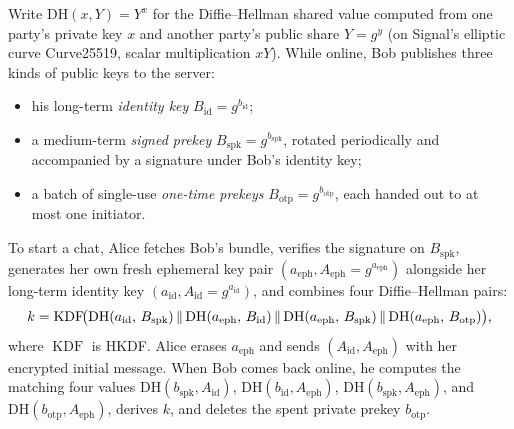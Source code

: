 Write $\mathrm{DH}(x, Y) = Y^x$ for the Diffie--Hellman shared value computed
from one party's private key $x$ and another party's public share $Y = g^y$ (on
Signal's elliptic curve Curve25519, scalar multiplication $xY$). While online,
Bob publishes three kinds of public keys to the server:
\begin{itemize}
  \item his long-term \emph{identity key} $B_{\mathrm{id}} = g^{b_{\mathrm{id}}}$;
  \item a medium-term \emph{signed prekey} $B_{\mathrm{spk}} = g^{b_{\mathrm{spk}}}$,
        rotated periodically and accompanied by a signature under Bob's identity
        key;
  \item a batch of single-use \emph{one-time prekeys} $B_{\mathrm{otp}} = g^{b_{\mathrm{otp}}}$,
        each handed out to at most one initiator.
\end{itemize}
To start a chat, Alice fetches Bob's bundle, verifies the signature on
$B_{\mathrm{spk}}$, generates her own fresh ephemeral key pair
$(a_{\mathrm{eph}}, A_{\mathrm{eph}} = g^{a_{\mathrm{eph}}})$ alongside her
long-term identity key $(a_{\mathrm{id}}, A_{\mathrm{id}} = g^{a_{\mathrm{id}}})$,
and combines four Diffie--Hellman pairs:
\[
  k = \operatorname{KDF}\!\bigl(
    \mathrm{DH}(a_{\mathrm{id}},\, B_{\mathrm{spk}}) \,\|\,
    \mathrm{DH}(a_{\mathrm{eph}},\, B_{\mathrm{id}}) \,\|\,
    \mathrm{DH}(a_{\mathrm{eph}},\, B_{\mathrm{spk}}) \,\|\,
    \mathrm{DH}(a_{\mathrm{eph}},\, B_{\mathrm{otp}})
  \bigr),
\]
where $\operatorname{KDF}$ is HKDF. Alice erases $a_{\mathrm{eph}}$ and sends
$(A_{\mathrm{id}}, A_{\mathrm{eph}})$ with her encrypted initial message. When
Bob comes back online, he computes the matching four values
$\mathrm{DH}(b_{\mathrm{spk}}, A_{\mathrm{id}})$,
$\mathrm{DH}(b_{\mathrm{id}}, A_{\mathrm{eph}})$,
$\mathrm{DH}(b_{\mathrm{spk}}, A_{\mathrm{eph}})$, and
$\mathrm{DH}(b_{\mathrm{otp}}, A_{\mathrm{eph}})$, derives $k$, and deletes the
spent private prekey $b_{\mathrm{otp}}$.

